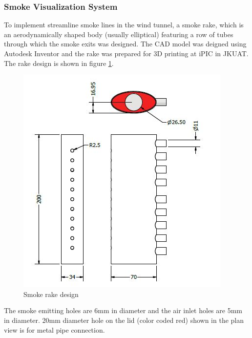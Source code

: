 \subsubsection{Smoke Visualization System}
To implement streamline smoke lines in the wind tunnel, a smoke rake, which is an aerodynamically shaped
body (usually elliptical) featuring a row of tubes through which the smoke exits was designed.
The CAD model was deigned using Autodesk Inventor and the rake was prepared for 3D printing at iPIC
in JKUAT. The rake design is shown in figure \ref{smoke}.
\begin{center}
	\begin{figure}[H]
		\centering
		\includegraphics[width=0.9\linewidth]{Figures/smoke and rake.JPG}
		\caption[Smoke Rake]{Smoke rake design}
		\label{smoke}
	\end{figure}
\end{center}
The smoke emitting holes are 6mm in diameter and the air inlet holes are 5mm in diameter.
20mm diameter hole on the lid (color coded red) shown in the  plan view is for metal pipe connection.

